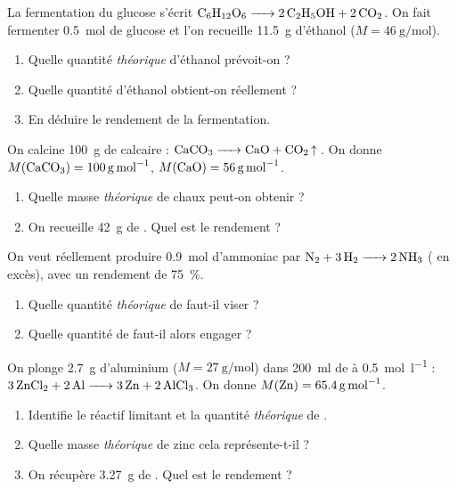 \documentclass[11pt,a4paper]{article}
\begin{document}
\begin{exo}
La fermentation du glucose s'écrit $\ce{C6H12O6 -> 2 C2H5OH + 2 CO2}$. On fait fermenter
\qty{0.5}{\mole} de glucose et l'on recueille \qty{11.5}{\gram} d'éthanol
($M=\qty{46}{\gram\per\mole}$).
\begin{enumerate}[label=\alph*)]
  \item Quelle quantité \emph{théorique} d'éthanol prévoit-on ?
  \item Quelle quantité d'éthanol obtient-on réellement ?
  \item En déduire le rendement de la fermentation.
\end{enumerate}
\end{exo}

\begin{exo}
On calcine \qty{100}{\gram} de calcaire  : $\ce{CaCO3 -> CaO + CO2 ^}$. On donne
$M(\ce{CaCO3})=\qty{100}{\gram\per\mole}$, $M(\ce{CaO})=\qty{56}{\gram\per\mole}$.
\begin{enumerate}[label=\alph*)]
  \item Quelle masse \emph{théorique} de chaux  peut-on obtenir ?
  \item On recueille \qty{42}{\gram} de . Quel est le rendement ?
\end{enumerate}
\end{exo}

\begin{exo}
On veut réellement produire \qty{0.9}{\mole} d'ammoniac par $\ce{N2 + 3 H2 -> 2 NH3}$ ( en
excès), avec un rendement de \qty{75}{\percent}.
\begin{enumerate}[label=\alph*)]
  \item Quelle quantité \emph{théorique} de  faut-il viser ?
  \item Quelle quantité de  faut-il alors engager ?
\end{enumerate}
\end{exo}

\begin{exo}
On plonge \qty{2.7}{\gram} d'aluminium ($M=\qty{27}{\gram\per\mole}$) dans \qty{200}{\milli\litre} de
 à \qty{0.5}{\mole\per\litre} : $\ce{3 ZnCl2 + 2 Al -> 3 Zn + 2 AlCl3}$. On donne
$M(\ce{Zn})=\qty{65.4}{\gram\per\mole}$.
\begin{enumerate}[label=\alph*)]
  \item Identifie le réactif limitant et la quantité \emph{théorique} de .
  \item Quelle masse \emph{théorique} de zinc cela représente-t-il ?
  \item On récupère \qty{3.27}{\gram} de . Quel est le rendement ?
\end{enumerate}
\end{exo}
\end{document}
